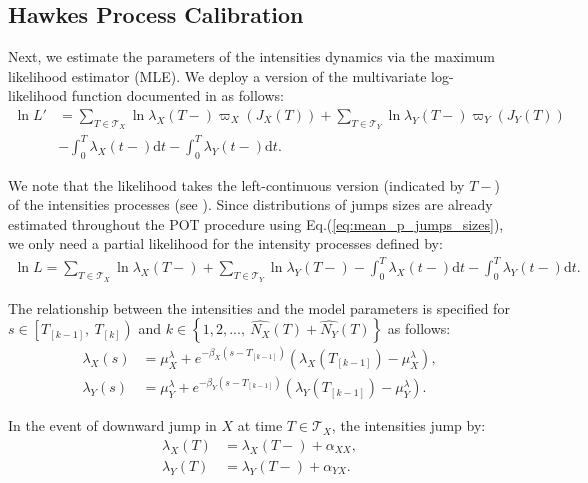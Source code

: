 \documentclass{article}
\newcommand{\diff}{\mathrm{d}}
\theoremstyle{definition}
\begin{document}
\subsection{Hawkes Process Calibration}

Next, we estimate the parameters of the intensities dynamics via the maximum likelihood estimator (MLE). We deploy a version of the multivariate log-likelihood function documented in \cite{embrechts2011multivariate} as follows:
\begin{align}
 \ln L' &= \sum_{T \in \mathcal{T}_X} \ln \lambda_X(T-)\varpi_X(J_X(T))
         + \sum_{T \in \mathcal{T}_Y} \ln \lambda_Y(T-)\varpi_Y(J_Y(T)) \nonumber\\
 &- \int_0^T \lambda_X(t-)\diff t 
 - \int_0^T \lambda_Y(t-)\diff t.
\end{align}

We note that the likelihood takes the left-continuous version (indicated by $T-$) of the intensities processes (see \citep[p. 232]{daley2003introduction}). Since distributions of jumps sizes are already estimated throughout the POT procedure using Eq.(\ref{eq:mean_p_jumps_sizes}), we only need a partial likelihood for the intensity processes defined by: 
\begin{align}
 \ln L = \sum_{T \in \mathcal{T}_X} \ln \lambda_X(T-)
 + 
  \sum_{T \in \mathcal{T}_Y} \ln \lambda_Y(T-)
 - \int_0^T \lambda_X(t-)\diff t
 - \int_0^T \lambda_Y(t-)\diff t. \label{eq:likelihood}
\end{align}

The relationship between the intensities and the model parameters is specified for $s \in \left[T_{[k-1]},\ T_{[k]}\right)$ and $k \in \left\{1,2,...,\ \widehat{N_X}(T)+\widehat{N_Y}(T)\right\}$ as follows:
\begin{align}
 \lambda_X(s) &= \mu_X^\lambda + e^{-\beta_X\left(s - T_{[k-1]}\right)}\left(\lambda_X(T_{[k-1]})-\mu_X^\lambda\right),\\
 \lambda_Y(s) &= \mu_Y^\lambda + e^{-\beta_Y\left(s - T_{[k-1]}\right)}\left(\lambda_Y(T_{[k-1]})-\mu_Y^\lambda\right).
\end{align}

In the event of downward jump in $X$ at time $T \in \mathcal{T}_X$, the intensities jump by:
\begin{equation}
   \begin{split}
 \lambda_X(T) &= \lambda_X(T-) + \alpha_{XX},\\
 \lambda_Y(T) &= \lambda_Y(T-) + \alpha_{YX}.
   \end{split}
\end{equation}
\end{document}
